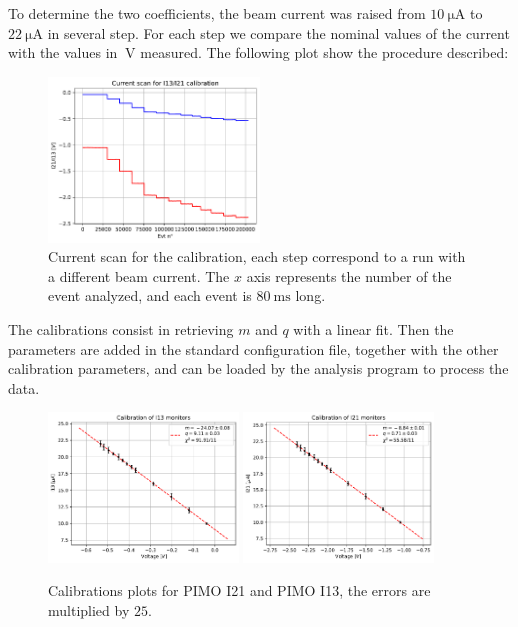 To determine the two coefficients, the beam current was raised from $\SI{10}{\micro \ampere}$ to $\SI{22}{\micro \ampere}$ in several step. For each step we compare the nominal values of the current with the values in $\SI{}{\volt}$ measured. The following plot show the procedure described:

\begin{figure}[ht]
\centering
\includegraphics[width = 0.5\textwidth]{Analysis/Calibrations/ScanI21I13.pdf}
\caption{Current scan for the calibration, each step correspond to a run with a different beam current. The $x$ axis represents the number of the event analyzed, and each event is $\SI{80}{\milli \second}$ long.}
\label{fig:ScanCurrent}
\end{figure}

The calibrations consist in retrieving $m$ and $q$ with a linear fit. Then the parameters are added in the standard configuration file, together with the other calibration parameters, and can be loaded by the analysis program to process the data.  

\begin{figure}[hbtp]
\centering
\includegraphics[width = 0.45\textwidth]{Analysis/Calibrations/I13.pdf}
\includegraphics[width = 0.45\textwidth]{Analysis/Calibrations/I21.pdf} 
\caption{Calibrations plots for PIMO I21 and PIMO I13, the errors are multiplied by $25$.}
\label{fig:PimoCalib}
\end{figure}

